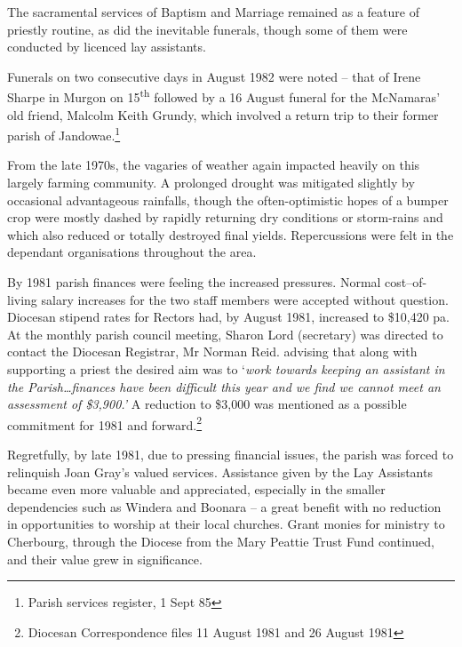 The sacramental services of Baptism and Marriage remained as a feature of priestly routine, as did the inevitable funerals, though some of them were conducted by licenced lay assistants.



Funerals on two consecutive days in August 1982 were noted -- that of Irene Sharpe in Murgon on 15\textsuperscript{th} followed by a 16 August funeral for the McNamaras' old friend, Malcolm Keith Grundy, which involved a return trip to their former parish of Jandowae.\footnote{Parish services register, 1 Sept 85}


From the late 1970s, the vagaries of weather again impacted heavily on this largely farming community. A prolonged drought was mitigated slightly by occasional advantageous rainfalls, though the often-optimistic hopes of a bumper crop were mostly dashed by rapidly returning dry conditions or storm-rains and which also reduced or totally destroyed final yields. Repercussions were felt in the dependant organisations throughout the area.



By 1981 parish finances were feeling the increased pressures. Normal cost--of-living salary increases for the two staff members were accepted without question. Diocesan stipend rates for Rectors had, by August 1981, increased to \$10,420 pa. At the monthly parish council meeting, Sharon Lord (secretary) was directed to contact the Diocesan Registrar, Mr Norman Reid. advising that along with supporting a priest the desired aim was to `\emph{work towards keeping an assistant in the Parish\ldots finances have been difficult this year and we find we cannot meet an assessment of \$3,900.'} A reduction to \$3,000 was mentioned as a possible commitment for 1981 and forward.\footnote{Diocesan Correspondence files 11 August 1981 and 26 August 1981}


Regretfully, by late 1981, due to pressing financial issues, the parish was forced to relinquish Joan Gray's valued services. Assistance given by the Lay Assistants became even more valuable and appreciated, especially in the smaller dependencies such as Windera and Boonara -- a great benefit with no reduction in opportunities to worship at their local churches. Grant monies for ministry to Cherbourg, through the Diocese from the Mary Peattie Trust Fund continued, and their value grew in significance.



